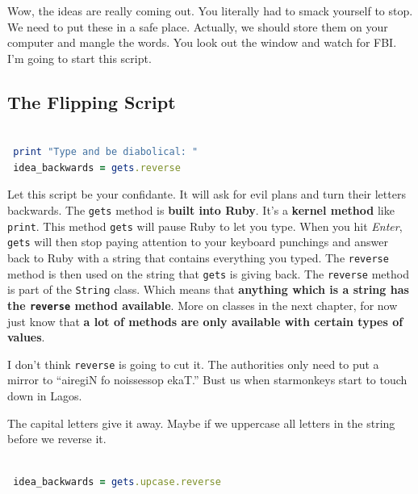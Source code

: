 \documentclass[10pt,twoside]{report}
\begin{document}
Wow, the ideas are really coming out.  You literally had to smack
yourself to stop.  We need to put these in a safe place.  Actually, we
should store them on your computer and mangle the words.  You look out
the window and watch for FBI.  I'm going to start this script.



\subsection{The Flipping Script}

\begin{lstlisting}[basicstyle=\ttfamily\color{basiccolor},
    commentstyle = \ttfamily\color{commentcolor},
    keywordstyle=\ttfamily\color{keywordscolor},
    stringstyle=\color{stringcolor},
    language=Ruby,
    basicstyle=\small\ttfamily,
    showstringspaces=false,
  ]

 print "Type and be diabolical: " 
 idea_backwards = gets.reverse

\end{lstlisting}


Let this script be your confidante.  It will ask for evil plans and
turn their letters backwards. The \lstinline[breaklines=true]|gets|
method is {\bf built into Ruby}.  It's a {\bf kernel method} like
\lstinline[breaklines=true]|print|.  This method
\lstinline[breaklines=true]|gets| will pause Ruby to let you type.
When you hit {\em Enter}, \lstinline[breaklines=true]|gets| will then
stop paying attention to your keyboard punchings and answer back to
Ruby with a string that contains everything you typed.  The
\lstinline[breaklines=true]|reverse| method is then used on the string
that \lstinline[breaklines=true]|gets| is giving back.  The
\lstinline[breaklines=true]|reverse| method is part of the
\lstinline[breaklines=true]|String| class.  Which means that {\bf
  anything which is a string has the
  \lstinline[breaklines=true]|reverse| method available}.  More on
classes in the next chapter, for now just know that {\bf a lot of
  methods are only available with certain types of values}.

I don't think \lstinline[breaklines=true]|reverse| is going to cut it.
The authorities only need to put a mirror to ``airegiN fo noissessop
ekaT.''  Bust us when starmonkeys start to touch down in Lagos.

The capital letters give it away.  Maybe if we uppercase all letters
in the string before we reverse it.


\begin{lstlisting}[basicstyle=\ttfamily\color{basiccolor},
    commentstyle = \ttfamily\color{commentcolor},
    keywordstyle=\ttfamily\color{keywordscolor},
    stringstyle=\color{stringcolor},
    language=Ruby,
    basicstyle=\small\ttfamily,
    showstringspaces=false,
  ]

 idea_backwards = gets.upcase.reverse

\end{lstlisting}
\end{document}
